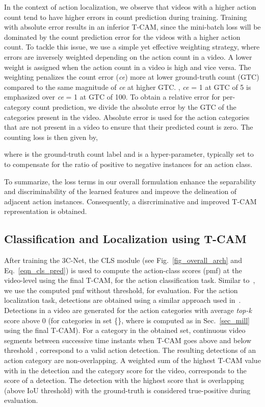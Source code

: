 \documentclass[10pt,twocolumn,letterpaper]{article}
\begin{document}
In the context of action localization, we observe that videos with a higher action count tend to have higher errors in count prediction during training. 
Training with absolute error results in an inferior T-CAM, since the mini-batch loss will be dominated by the count prediction error for the videos with a higher action count.
To tackle this issue, we use a simple yet effective weighting strategy, where errors are inversely weighted depending on the action count in a video. A lower weight is assigned when the action count in a video is high and vice versa. 
The weighting penalizes the count error (\emph{ce}) more at lower ground-truth count (GTC) compared to the same magnitude of \emph{ce} at higher GTC. \Eg, \emph{ce} = 1 at GTC of 5 is emphasized over \emph{ce} = 1 at GTC of 100.
To obtain a relative error for per-category count prediction, we divide the absolute error by the GTC of the categories present in the video. Absolute error is used for the action categories that are not present in a video to ensure that their predicted count is zero. The counting loss is then given by,



where  is the ground-truth count label and  is a hyper-parameter, typically set to  to compensate for the ratio of positive to negative instances for an action class.

To summarize, the loss terms in our overall formulation enhance the separability and  discriminability of the learned features and improve the delineation of adjacent action instances. Consequently, a disrcriminative and improved T-CAM representation is obtained.

\subsection{Classification and Localization using T-CAM\label{sec_cls_loc}}
After training the 3C-Net, the CLS module (see Fig.~\ref{fig_overall_arch} and Eq.~\ref{eqn_cls_pred}) is used to compute the action-class scores (pmf) at the video-level using the final T-CAM, for the action classification task. Similar to~\cite{untrimnets,wtalc}, we use the computed pmf without threshold, for evaluation. For the action localization task, detections are obtained using a similar approach used in~\cite{wtalc}. Detections in a video are generated for the action categories with average \emph{top-k} score above 0 (\ie for categories in set \{\}, where  is computed as in Sec.~\ref{sec_mill} using the final T-CAM). For a category  in the obtained set, continuous video segments between successive time instants when T-CAM goes above and below threshold , correspond to a valid action detection. The resulting detections of an action category are non-overlapping. A weighted sum of the highest T-CAM value with in the detection and the category score for the video, corresponds to the score of a detection. The detection with the highest score that is overlapping (above IoU threshold) with the ground-truth is considered true-positive during evaluation.
\end{document}
